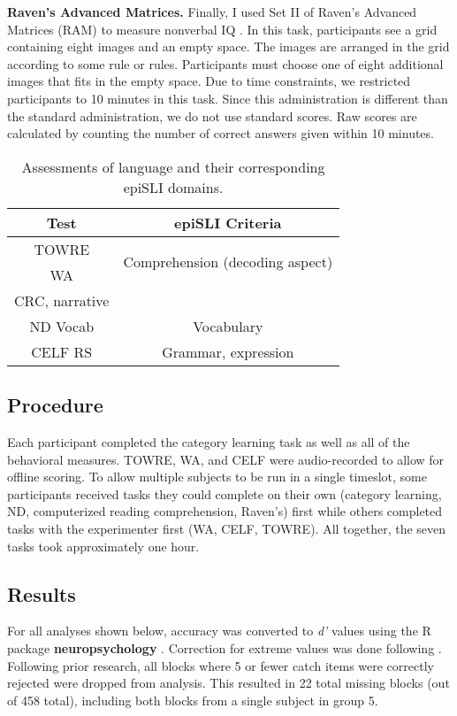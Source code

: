 \documentclass[../dissertation.tex]{subfiles}
\begin{document}
	\textbf{Raven's Advanced Matrices.} Finally, I used Set II of Raven's Advanced Matrices (RAM) to measure nonverbal IQ \citep{Raven1998}. In this task, participants see a grid containing eight images and an empty space. The images are arranged in the grid according to some rule or rules. Participants must choose one of eight additional images that fits in the empty space. Due to time constraints, we restricted participants to 10 minutes in this task. Since this administration is different than the standard administration, we do not use standard scores. Raw scores are calculated by counting the number of correct answers given within 10 minutes.

\begin{table}[H]
\caption{Assessments of language and their corresponding epiSLI domains.}
\vspace{-10pt}
\begin{center}
\begin{tabular}{ c|c } 
 \hline 
 Test & epiSLI Criteria \\ 
 \hline
 TOWRE & \multirow{2}{*}{Comprehension (decoding aspect)}\\ 
 WA & \\ 
 CRC, narrative \\
 ND Vocab & Vocabulary \\ 
 CELF RS & Grammar, expression \\ 
 \hline
\end{tabular}
\end{center}
\label{slitable}
\end{table}


\subsection{Procedure}
	Each participant completed the category learning task as well as all of the behavioral measures. TOWRE, WA, and CELF were audio-recorded to allow for offline scoring. To allow multiple subjects to be run in a single timeslot, some participants received tasks they could complete on their own (category learning, ND, computerized reading comprehension, Raven's) first while others completed tasks with the experimenter first (WA, CELF, TOWRE). All together, the seven tasks took approximately one hour.
	
\subsection{Results}
	For all analyses shown below, accuracy was converted to \textit{d'} values \citep{macmillan2004} using the R package \textbf{neuropsychology} \citep{neuropsych}. Correction for extreme values was done following \citep{Hautus1995}. Following prior research, all blocks where 5 or fewer catch items were correctly rejected were dropped from analysis. This resulted in 22 total missing blocks (out of 458 total), including both blocks from a single subject in group 5. \par
\end{document}
